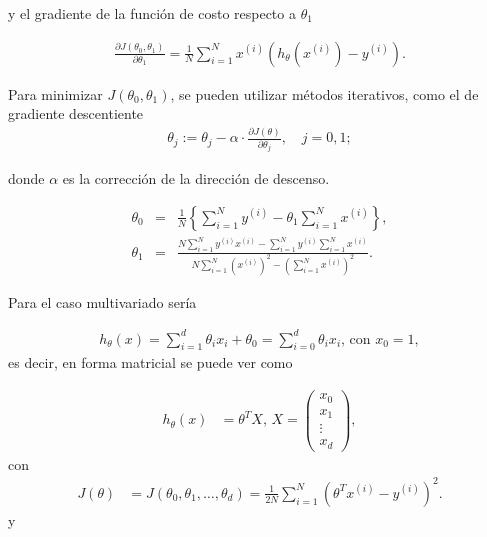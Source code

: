 \documentclass[12pt]{article}
\begin{document}
y el gradiente de la función de costo respecto a $\theta_1$

\begin{eqnarray*}
\frac{\partial J(\theta_0, \theta_1)}{\partial \theta_1} = \frac{1}{N} \sum_{i=1}^{N} x^{(i)} \left( h_\theta(x^{(i)}) - y^{(i)} \right).
\end{eqnarray*}

Para minimizar $J(\theta_0, \theta_1)$, se pueden utilizar métodos iterativos, como el de gradiente descentiente
\begin{eqnarray*}
\theta_j := \theta_j - \alpha \cdot \frac{\partial J(\theta)}{\partial \theta_j}, \quad j = 0, 1;
\end{eqnarray*}

donde $\alpha$ es la corrección de la direcci\'on de descenso.


\begin{eqnarray*}
\theta_{0}&=& \frac{1}{N} \left\{\sum_{i=1}^{N} y^{(i)}-\theta_{1} \sum_{i=1}^{N}  x^{(i)}\right\},\\
\theta_{1}&=& \frac{N\sum_{i=1}^{N} y^{(i)}x^{(i)} -\sum_{i=1}^{N} y^{(i)}\sum_{i=1}^{N} x^{(i)}}{N\sum_{i=1}^{N} (x^{(i)})^{2}-(\sum_{i=1}^{N} x^{(i)})^{2}}.
\end{eqnarray*}

Para el caso multivariado ser\'ia

\begin{eqnarray*}
h_{\theta}\left(x\right)=\sum_{i=1}^{d}\theta_{i}x_{i}+\theta_{0}=\sum_{i=0}^{d}\theta_{i}x_{i}\textrm{, con }x_{0}=1,
\end{eqnarray*}
es decir, en forma matricial se puede ver como

\begin{eqnarray*}
h_{\theta}(x) &= \theta^{T} X\textrm{, } X = \begin{pmatrix} x_0 \\ x_1 \\ \vdots \\ x_d \end{pmatrix},
\end{eqnarray*}
con 
\begin{eqnarray*}
J(\theta) &= J(\theta_0, \theta_1, \ldots, \theta_d) = \frac{1}{2N} \sum_{i=1}^{N} \left( \theta^{T} x^{(i)} - y^{(i)} \right)^2.
\end{eqnarray*}
y
\end{document}
